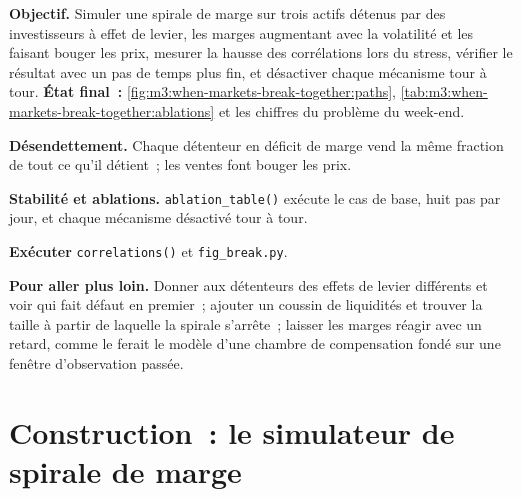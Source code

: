 \begin{tutorial}
\textbf{Objectif.} Simuler une spirale de marge sur trois actifs détenus par des investisseurs à effet de levier, les marges augmentant avec la volatilité et les  faisant bouger les prix,
mesurer la hausse des corrélations lors du stress, vérifier le résultat avec un pas de temps plus fin, et désactiver chaque mécanisme tour à tour. \textbf{État final~:}
\cref{fig:m3:when-markets-break-together:paths}, \cref{tab:m3:when-markets-break-together:ablations} et les chiffres du problème du week-end.
\begin{tutsteps}
\item \textbf{Désendettement.} Chaque détenteur en déficit de marge vend la même fraction de tout ce qu'il détient~; les ventes font bouger les prix.
\label{lst:m3:when-markets-break-together:delever}
\item \textbf{Stabilité et ablations.} \texttt{ablation\_table()} exécute le cas de base, huit pas par jour, et chaque mécanisme désactivé tour à tour.
\item \textbf{Exécuter} \texttt{correlations()} et \texttt{fig\_break.py}.
\end{tutsteps}
\textbf{Pour aller plus loin.} Donner aux détenteurs des effets de levier différents et voir qui fait défaut en premier~; ajouter un coussin de liquidités et trouver la taille à partir de laquelle la spirale s'arrête~;
laisser les marges réagir avec un retard, comme le ferait le modèle d'une chambre de compensation fondé sur une fenêtre d'observation passée.
\end{tutorial}

\section{Construction~: le simulateur de spirale de marge}\label{bld:m3:when-markets-break-together:marginspiral}

